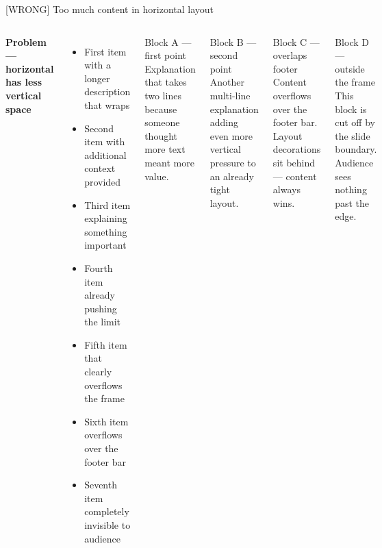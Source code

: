 \documentclass[aspectratio=169,t,xcolor=table]{beamer}
\begin{document}
\begin{frame}{[WRONG] Too much content in horizontal layout}

    \begin{columns}
        \textbf{Problem — horizontal has less vertical space}
        \begin{itemize}
            \item First item with a longer description that wraps
            \item Second item with additional context provided
            \item Third item explaining something important
            \item Fourth item already pushing the limit
            \item Fifth item that clearly overflows the frame
            \item Sixth item overflows over the footer bar
            \item Seventh item completely invisible to audience
        \end{itemize}

        \begin{block}{Block A — first point}
            Explanation that takes two lines because someone thought more text meant more value.
        \end{block}
        \vspace{0.4em}
        \begin{block}{Block B — second point}
            Another multi-line explanation adding even more vertical pressure to an already tight layout.
        \end{block}
        \vspace{0.4em}
        \begin{alertblock}{Block C — overlaps footer}
            Content overflows over the footer bar. Layout decorations sit behind — content always wins.
        \end{alertblock}
        \vspace{0.4em}
        \begin{block}{Block D — outside the frame}
            This block is cut off by the slide boundary. Audience sees nothing past the edge.
        \end{block}
    \end{columns}

\end{frame}
\end{document}

